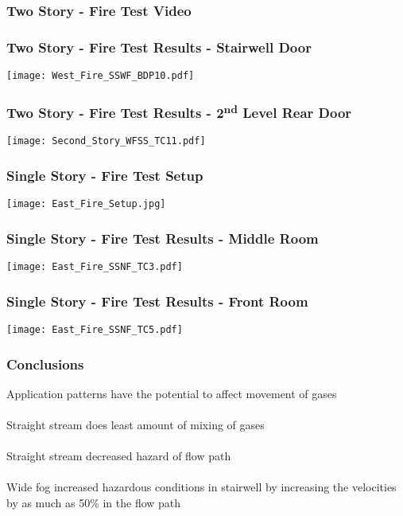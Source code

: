 \documentclass[t]{beamer}
\begin{document}
\begin{frame}
\frametitle{Two Story - Fire Test Video}
\centerline{}
\centerline{}
\end{frame}

\begin{frame}%
\frametitle{Two Story - Fire Test Results - Stairwell Door}
\centerline{\texttt{[image: West\_Fire\_SSWF\_BDP10.pdf]}}
\end{frame}

\begin{frame}%
\frametitle{Two Story - Fire Test Results - 2\textsuperscript{nd} Level Rear Door}
\centerline{\texttt{[image: Second\_Story\_WFSS\_TC11.pdf]}}
\end{frame}


\begin{frame}
\frametitle{Single Story - Fire Test Setup}
\centerline{\texttt{[image: East\_Fire\_Setup.jpg]}}
\end{frame}

\begin{frame}
\frametitle{Single Story - Fire Test Results - Middle Room}
\centerline{\texttt{[image: East\_Fire\_SSNF\_TC3.pdf]}}
\end{frame}

\begin{frame}
\frametitle{Single Story - Fire Test Results - Front Room}
\centerline{\texttt{[image: East\_Fire\_SSNF\_TC5.pdf]}}
\end{frame}

\begin{frame}
\frametitle{Conclusions}
Application patterns have the potential to affect movement of gases
\\~\\
Straight stream does least amount of mixing of gases
\\~\\
Straight stream decreased hazard of flow path 
\\~\\
Wide fog increased hazardous conditions in stairwell by increasing the velocities by as much as 50\% in the flow path
\\~\\
\end{frame}
\end{document}
